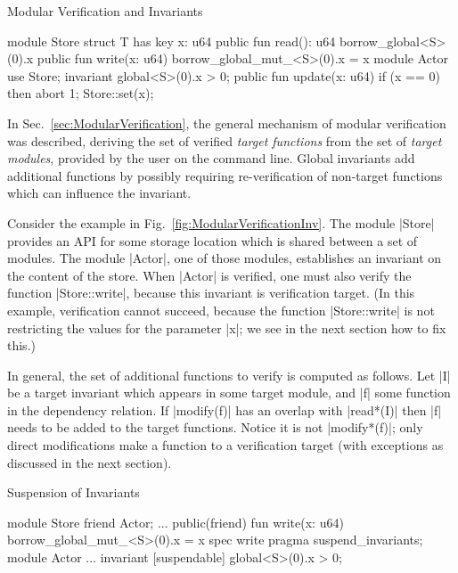 \begin{Figure}
  \caption{Modular Verification and Invariants}
  \label{fig:ModularVerificationInv}
  \centering
\begin{MoveBox}
  module Store {
    struct T has key { x: u64 }
    public fun read(): u64 { borrow_global<S>(0).x }
    public fun write(x: u64) { borrow_global_mut_<S>(0).x = x }
  }
  module Actor {
    use Store;
    invariant global<S>(0).x > 0;
    public fun update(x: u64) {
      if (x == 0) then abort 1;
      Store::set(x);
    }
  }
\end{MoveBox}
\end{Figure}

In Sec.~\ref{sec:ModularVerification}, the general mechanism of modular
verification was described, deriving the set of verified \emph{target
  functions} from the set of \emph{target modules}, provided by the user on the
command line. Global invariants add additional functions by possibly requiring
re-verification of non-target functions which can influence the invariant.

Consider the example in Fig.~\ref{fig:ModularVerificationInv}. The module
|Store| provides an API for some storage location which is shared between a set
of modules. The module |Actor|, one of those modules, establishes an
invariant on the content of the store. When |Actor| is verified, one must
also verify the function |Store::write|, because this invariant is verification
target.  (In this example, verification cannot succeed, because the function
|Store::write| is not restricting the values for the parameter |x|; we see in
the next section how to fix this.)

In general, the set of additional functions to verify is computed as
follows. Let |I| be a target invariant which appears in some target module, and
|f| some function in the dependency relation. If |modify(f)| has an overlap
with |read*(I)| then |f| needs to be added to the target functions. Notice it is
not |modify*(f)|; only direct modifications make a function to a verification
target (with exceptions as discussed in the next section).



\begin{Figure}
  \caption{Suspension of Invariants}
  \label{fig:SuspensionInv}
  \centering
\begin{MoveBox}
  module Store {
    friend Actor;
    ...
    public(friend) fun write(x: u64) { borrow_global_mut_<S>(0).x = x }
    spec write { pragma suspend_invariants; }
  }
  module Actor {
    ...
    invariant [suspendable] global<S>(0).x > 0;
  }
\end{MoveBox}
\end{Figure}

